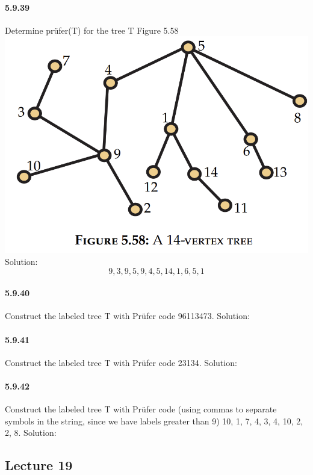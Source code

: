 \documentclass{article}
\begin{document}
\paragraph{5.9.39}
Determine prüfer(T) for the tree T Figure 5.58\newline
\includegraphics{0073}\newline
Solution:\newline
$$9,3,9,5,9,4,5,14,1,6,5,1$$
\paragraph{5.9.40}
Construct the labeled tree T with Prüfer code 96113473.\newline
Solution:\newline
\paragraph{5.9.41}
Construct the labeled tree T with Prüfer code 23134.\newline
Solution:\newline
\paragraph{5.9.42}
Construct the labeled tree T with Prüfer code (using commas to separate symbols
in the string, since we have labels greater than 9) 10, 1, 7, 4, 3, 4, 10, 2, 2, 8.\newline
Solution:\newline
\subsection{Lecture 19}
\end{document}
